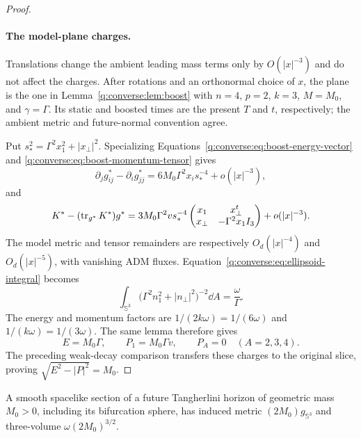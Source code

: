 \begin{proof}
\paragraph{The model-plane charges.}
Translations change the ambient leading mass terms only by $O(|x|^{-3})$
and do not affect the charges. After rotations and an orthonormal
choice of $x$, the plane is the one in Lemma~\ref{q:converse:lem:boost}
with $n=4$, $p=2$, $k=3$, $M=M_0$, and $\gamma=\Gamma$.
Its static and boosted times are the present $T$ and $t$, respectively;
the ambient metric and future-normal convention agree.

Put $s_*^2=\Gamma^2x_1^2+|x_\perp|^2$. Specializing
Equations~\eqref{q:converse:eq:boost-energy-vector} and
\eqref{q:converse:eq:boost-momentum-tensor} gives
\begin{equation}
 \partial_jg^*_{ij}-\partial_ig^*_{jj}
   =6M_0\Gamma^2x_i s_*^{-4}+o(|x|^{-3}),
 \label{q4:rec:boost-energy-integrand}
\end{equation}
and
\begin{equation}
 K^*-(\operatorname{tr}_{g^*}K^*)g^*
 =3M_0\Gamma^2v s_*^{-4}
 \begin{pmatrix}
  x_1&x_\perp^t\\
  x_\perp&-\Gamma^2x_1I_3
 \end{pmatrix}
 +o(|x|^{-3}).
 \label{q4:rec:boost-momentum-integrand}
\end{equation}
The model metric and tensor remainders are respectively
$O_d(|x|^{-4})$ and $O_d(|x|^{-5})$, with vanishing ADM fluxes.
Equation~\eqref{q:converse:eq:ellipsoid-integral} becomes
\begin{equation}
 \int_{\mathbb S^3}
   \bigl(\Gamma^2n_1^2+|n_\perp|^2\bigr)^{-2}\dd A
 =\frac{\omega}{\Gamma}.
 \label{q4:rec:ellipsoid-integral}
\end{equation}
The energy and momentum factors are
$1/(2k\omega)=1/(6\omega)$ and $1/(k\omega)=1/(3\omega)$.
The same lemma therefore gives
\begin{equation}
 E=M_0\Gamma,\qquad P_1=M_0\Gamma v,
 \qquad P_A=0\quad(A=2,3,4).
 \label{q4:rec:boost-charges}
\end{equation}
The preceding weak-decay comparison transfers these charges to the
original slice, proving $\sqrt{E^2-|P|^2}=M_0$.
\end{proof}

\begin{lemma}
\label{q4:rec:horizon-area}
A smooth spacelike section of a future Tangherlini horizon of geometric
mass $M_0>0$, including its bifurcation sphere, has induced metric
$(2M_0)g_{\mathbb S^3}$ and three-volume
$\omega(2M_0)^{3/2}$.
\end{lemma}

